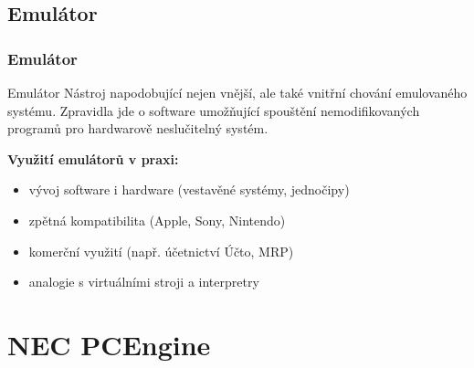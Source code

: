 \documentclass[10pt]{beamer}
\begin{document}
\subsection{Emulátor}
\begin{frame}
\frametitle{Emulátor}
\begin{alertblock}{Emulátor}
Nástroj napodobující nejen vnější, ale také vnitřní chování emulovaného
systému. Zpravidla jde o software umožňující spouštění nemodifikovaných
programů pro hardwarově neslučitelný systém.
\end{alertblock}
\vglue 5mm
{\bf Využití emulátorů v praxi:}
\begin{itemize}
	\item vývoj software i hardware {\footnotesize (vestavěné systémy,
	jednočipy)}
	\item zpětná kompatibilita {\footnotesize (Apple, Sony, Nintendo)}
	\item komerční využití {\footnotesize (např. účetnictví Účto, MRP)}
	\item analogie s virtuálními stroji a interpretry
\end{itemize}
\end{frame}

\section{NEC PCEngine}

\end{document}
